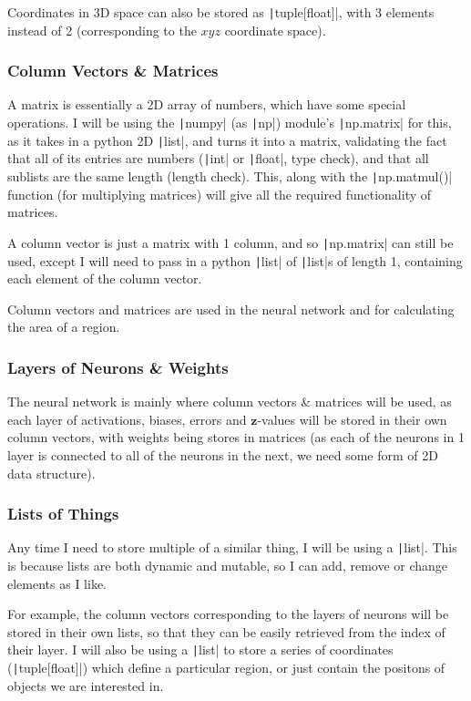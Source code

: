 \documentclass[12pt]{report}
\newcommand{\pil}[1]{\texttt|#1|}
\begin{document}
Coordinates in 3D space can also be stored as \pil{tuple[float]}, with 3 elements instead of 2 (corresponding to the $xyz$ coordinate space).

\subsubsection{Column Vectors \& Matrices}
A matrix is essentially a 2D array of numbers, which have some special operations. I will be using the \pil{numpy} (as \pil{np}) module's \pil{np.matrix} for this, as it takes in a python 2D \pil{list}, and turns it into a matrix, validating the fact that all of its entries are numbers (\pil{int} or \pil{float}, type check), and that all sublists are the same length (length check). This, along with the \pil{np.matmul()} function (for multiplying matrices) will give all the required functionality of matrices.

A column vector is just a matrix with 1 column, and so \pil{np.matrix} can still be used, except I will need to pass in a python \pil{list} of \pil{list}s of length 1, containing each element of the column vector.

Column vectors and matrices are used in the neural network and for calculating the area of a region.

\subsubsection{Layers of Neurons \& Weights}
The neural network is mainly where column vectors \& matrices will be used, as each layer of activations, biases, errors and $\mathbf{z}$-values will be stored in their own column vectors, with weights being stores in matrices (as each of the neurons in 1 layer is connected to all of the neurons in the next, we need some form of 2D data structure).

\subsubsection{Lists of Things}
Any time I need to store multiple of a similar thing, I will be using a \pil{list}. This is because lists are both dynamic and mutable, so I can add, remove or change elements as I like.

For example, the column vectors corresponding to the layers of neurons will be stored in their own lists, so that they can be easily retrieved from the index of their layer. I will also be using a \pil{list} to store a series of coordinates (\pil{tuple[float]}) which define a particular region, or just contain the positons of objects we are interested in.
\end{document}
